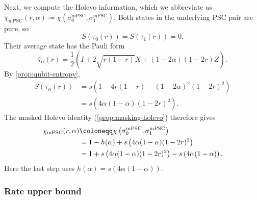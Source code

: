 \documentclass[11pt]{article}
\theoremstyle{remark}
\newcommand{\mPSC}{\mathrm{mPSC}}
\begin{document}
Next, we compute the Holevo information, which we abbreviate as $\chi_{\mPSC}(r,\alpha) \coloneqq \chi(\sigma_0^{\mPSC},\sigma_1^{\mPSC})$. Both states in the underlying PSC pair are pure, so
\begin{equation*}
S(\tau_0(r)) = S(\tau_1(r)) = 0.
\end{equation*}
Their average state has the Pauli form
\begin{equation*}
\bar{\tau}_\alpha(r)
=\frac{1}{2}\left(I+2\sqrt{r(1-r)}X
+(1-2\alpha)(1-2r)Z\right).
\end{equation*}
By \cref{prop:qubit-entropy},
\begin{align*}
S(\bar{\tau}_\alpha(r))
&= s\left(1-4r(1-r)-(1-2\alpha)^2(1-2r)^2\right) \\
&= s\left(4\alpha(1-\alpha)(1-2r)^2\right).
\end{align*}
The masked Holevo identity (\cref{prop:masking-holevo}) therefore gives
\begin{align}
\chi_{\mPSC}(r,\alpha)
&\coloneqq \chi\left(\sigma_0^{\mPSC},\sigma_1^{\mPSC}\right) \notag \\
&=1-h(\alpha)
+s\left(4\alpha(1-\alpha)(1-2r)^2\right) \notag \\
&=1+s\left(4\alpha(1-\alpha)(1-2r)^2\right)
-s\left(4\alpha(1-\alpha)\right).
\label{eq:mpsc-holevo}
\end{align}
Here the last step uses $h(\alpha) = s\left(4\alpha(1-\alpha)\right)$.

\subsubsection{Rate upper bound}
\label{subsubsec:mpsc-rate}
\end{document}
